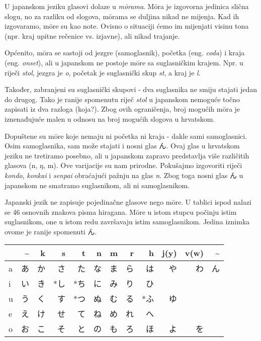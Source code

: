 
\author{autor}

	
	
	U japanskom jeziku glasovi dolaze u \textit{m\={o}rama}. M\={o}ra je izgovorna jedinica slična slogu, no za razliku od slogova, m\={o}rama se duljina nikad ne mijenja. Kad ih izgovaramo, m\={o}re su kao note. Ovisno o situaciji ćemo im mijenjati visinu tona (npr. kraj upitne rečenice vs. izjavne), ali nikad trajanje.
	
	Općenito, m\={o}ra se sastoji od jezgre (samoglasnik), početka (eng. \textit{coda}) i kraja (eng. \textit{onset}), ali u japanskom ne postoje m\={o}re sa suglasničkim krajem. Npr. u riječi \textit{stol}, jezgra je \textit{o}, početak je suglasnički skup \textit{st}, a kraj je \textit{l}.
	
	Također, zabranjeni su suglasnički skupovi - dva suglasnika ne smiju stajati jedan do drugog. Tako je ranije spomenutu riječ \textit{stol} u japanskom nemoguće točno zapisati iz dva razloga (koja?). Zbog ovih ograničenja, broj mogućih m\={o}ra je iznenađujuće malen u odnosu na broj mogućih slogova u hrvatskom.
	
	Dopuštene su m\={o}re koje nemaju ni početka ni kraja - dakle sami samoglasnici. Osim samoglasnika, sam može stajati i nosni glas ん. Ovaj glas u hrvatskom jeziku ne tretiramo posebno, ali u japanskom zapravo predstavlja više različitih glasova (n, ŋ, m). Ove varijacije su nam prirodne. Pokušajmo izgovoriti riječi \textit{kondo}, \textit{konkai} i \textit{senpai} obraćajući pažnju na glas \textit{n}. Zbog toga nosni glas ん u japanskom ne smatramo suglasnikom, ali ni samoglasnikom.
	
	
	Japanski jezik ne zapisuje pojedinačne glasove nego m\={o}re. U tablici ispod nalazi se 46 osnovnih znakova pisma hiragana. M\={o}re u istom stupcu počinju istim suglasnikom, one u istom redu završavaju istim samoglasnikom. Jedina iznimka ovome je ranije spomenuti ん.
	
	\setlength{\tabcolsep}{10pt}
	\vspace{10pt}
	\begin{tabular}{|l|r|r|r|r|r|r|r|r|r|r|r|}
		\hline
		&\textasciitilde&k&s&t&n&m&r&h&j(y)&v(w)&\textasciitilde\\
		\hline
		a&あ&か&さ&た&な&ま&ら&は&や&わ&ん\\
		i&い&き&*し&*ち&に&み&り&ひ&&&\\
		u&う&く&す&*つ&ぬ&む&る&*ふ&ゆ&&\\
		e&え&け&せ&て&ね&め&れ&へ&&&\\
		o&お&こ&そ&と&の&も&ろ&ほ&よ&を&\\
		\hline
	\end{tabular}
	
